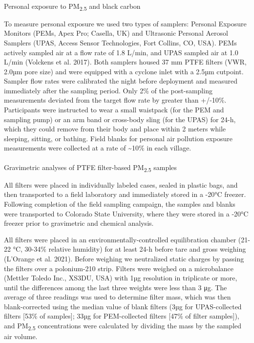 \documentclass[
  letterpaper,
  DIV=11,
  numbers=noendperiod]{scrartcl}
\makeatletter
\let\oldparagraph\paragraph
\renewcommand{\paragraph}{
    \@ifstar
      \xxxParagraphStar
      \xxxParagraphNoStar
  }
\newcommand{\xxxParagraphStar}[1]{\oldparagraph*{#1}\mbox{}}
\newcommand{\xxxParagraphNoStar}[1]{\oldparagraph{#1}\mbox{}}
\makeatother
\begin{document}
\paragraph{\texorpdfstring{Personal exposure to PM\textsubscript{2.5}
and black
carbon}{Personal exposure to PM2.5 and black carbon}}\label{personal-exposure-to-pm2.5-and-black-carbon}

To measure personal exposure we used two types of samplers: Personal
Exposure Monitors (PEMs, Apex Pro; Casella, UK) and Ultrasonic Personal
Aerosol Samplers (UPAS, Access Sensor Technologies, Fort Collins, CO,
USA). PEMs actively sampled air at a flow rate of 1.8 L/min, and UPAS
sampled air at 1.0 L/min (Volckens et al. 2017). Both samplers housed 37
mm PTFE filters (VWR, 2.0µm pore size) and were equipped with a cyclone
inlet with a 2.5µm cutpoint. Sampler flow rates were calibrated the
night before deployment and measured immediately after the sampling
period. Only 2\% of the post-sampling measurements deviated from the
target flow rate by greater than +/-10\%. Participants were instructed
to wear a small waistpack (for the PEM and sampling pump) or an arm band
or cross-body sling (for the UPAS) for 24-h, which they could remove
from their body and place within 2 meters while sleeping, sitting, or
bathing. Field blanks for personal air pollution exposure measurements
were collected at a rate of \textasciitilde10\% in each village.

\paragraph{\texorpdfstring{Gravimetric analyses of PTFE filter-based
PM\textsubscript{2.5}
samples}{Gravimetric analyses of PTFE filter-based PM2.5 samples}}\label{gravimetric-analyses-of-ptfe-filter-based-pm2.5-samples}

All filters were placed in individually labeled cases, sealed in plastic
bags, and then transported to a field laboratory and immediately stored
in a -20°C freezer. Following completion of the field sampling campaign,
the samples and blanks were transported to Colorado State University,
where they were stored in a -20°C freezer prior to gravimetric and
chemical analysis.

All filters were placed in an environmentally-controlled equilibration
chamber (21-22 °C, 30-34\% relative humidity) for at least 24-h before
tare and gross weighing (L'Orange et al. 2021). Before weighing we
neutralized static charges by passing the filters over a polonium-210
strip. Filters were weighed on a microbalance (Mettler Toledo Inc.,
XS3DU, USA) with 1µg resolution in triplicate or more, until the
differences among the last three weights were less than 3 μg. The
average of three readings was used to determine filter mass, which was
then blank-corrected using the median value of blank filters (3µg for
UPAS-collected filters {[}53\% of samples{]}; 33µg for PEM-collected
filters {[}47\% of filter samples{]}), and PM\textsubscript{2.5}
concentrations were calculated by dividing the mass by the sampled air
volume.
\end{document}
